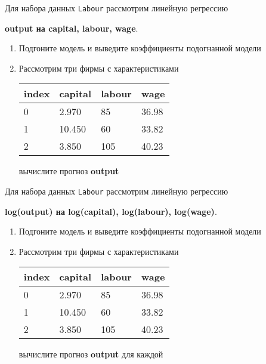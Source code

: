 \begin{exercise}
Для набора данных \texttt{Labour} рассмотрим линейную регрессию 
\begin{center}
	\textbf{output на capital, labour, wage}.
\end{center}
\begin{enumerate}
	\item Подгоните модель и выведите коэффициенты подогнанной модели
	\item Рассмотрим три фирмы с характеристиками
	\begin{center}
		\begin{tabular}{|l||l|l|l|}\hline
			index & capital & labour & wage \\ \hline\hline
			0 & 2.970 & 85 & 36.98\\
			1 & 10.450 & 60 & 33.82  \\
			2 & 3.850 & 105 & 40.23\\ \hline
		\end{tabular}
	\end{center}
	вычислите прогноз \textbf{output}
\end{enumerate}
\end{exercise}

\begin{exercise}
Для набора данных \texttt{Labour} рассмотрим линейную регрессию 
\begin{center}
	\textbf{log(output) на log(capital), log(labour), log(wage)}.
\end{center}
\begin{enumerate}
	\item Подгоните модель и выведите коэффициенты подогнанной модели
	\item Рассмотрим три фирмы с характеристиками
	\begin{center}
		\begin{tabular}{|l||l|l|l|}\hline
			index & capital & labour & wage \\ \hline\hline
			0 & 2.970 & 85 & 36.98\\
			1 & 10.450 & 60 & 33.82  \\
			2 & 3.850 & 105 & 40.23\\ \hline
		\end{tabular}
	\end{center}
	вычислите прогноз \textbf{output} для каждой
\end{enumerate}
\end{exercise}


